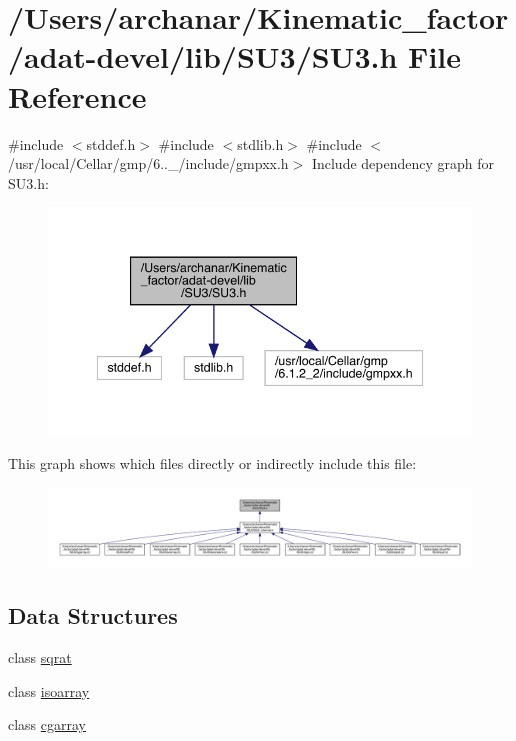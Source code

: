 \hypertarget{adat-devel_2lib_2SU3_2SU3_8h}{}\section{/\+Users/archanar/\+Kinematic\+\_\+factor/adat-\/devel/lib/\+S\+U3/\+S\+U3.h File Reference}
\label{adat-devel_2lib_2SU3_2SU3_8h}
{\ttfamily \#include $<$stddef.\+h$>$}\newline
{\ttfamily \#include $<$stdlib.\+h$>$}\newline
{\ttfamily \#include $<$/usr/local/\+Cellar/gmp/6..\+\_/include/gmpxx.\+h$>$}\newline
Include dependency graph for S\+U3.\+h\+:
\nopagebreak
\begin{figure}[H]
\begin{center}
\leavevmode
\includegraphics[width=342pt]{d7/dd3/adat-devel_2lib_2SU3_2SU3_8h__incl}
\end{center}
\end{figure}
This graph shows which files directly or indirectly include this file\+:
\nopagebreak
\begin{figure}[H]
\begin{center}
\leavevmode
\includegraphics[width=350pt]{db/d68/adat-devel_2lib_2SU3_2SU3_8h__dep__incl}
\end{center}
\end{figure}
\subsection*{Data Structures}
\begin{DoxyCompactItemize}
\item 
class \mbox{\hyperlink{classsqrat}{sqrat}}
\item 
class \mbox{\hyperlink{classisoarray}{isoarray}}
\item 
class \mbox{\hyperlink{classcgarray}{cgarray}}
\end{DoxyCompactItemize}
